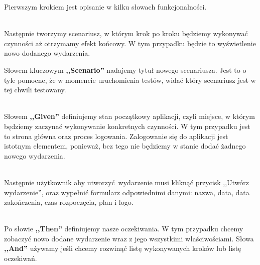 Pierwszym krokiem jest opisanie w kilku słowach funkcjonalności.
\begin{code}
	
\end{code}\\

Następnie tworzymy scenariusz, w którym krok po kroku będziemy wykonywać czynności aż otrzymamy efekt końcowy. W tym przypadku będzie to wyświetlenie nowo dodanego wydarzenia.

Słowem kluczowym \textbf{,,Scenario''} nadajemy tytuł nowego scenariusza. Jest to o~ tyle pomocne, że w momencie uruchomienia testów, widać który scenariusz jest w tej chwili testowany.

\begin{code}
	
\end{code}\\

Słowem \textbf{,,Given''} definiujemy stan początkowy aplikacji, czyli miejsce, w którym będziemy zaczynać wykonywanie konkretnych czynności. W tym przypadku jest to strona główna oraz proces logowania. Zalogowanie się do aplikacji jest istotnym elementem, ponieważ, bez tego nie będziemy w stanie dodać żadnego nowego wydarzenia.

\begin{code}
	
\end{code}\\

Następnie użytkownik aby utworzyć wydarzenie musi kliknąć przycisk ,,Utwórz wydarzenie'', oraz wypełnić formularz odpowiednimi danymi: nazwa, data, data zakończenia, czas rozpoczęcia, plan i logo.

\begin{code}
	
\end{code}\\

Po słowie \textbf{,,Then''} definiujemy nasze oczekiwania. W tym przypadku chcemy zobaczyć nowo dodane wydarzenie wraz z jego wszystkimi właściwościami. Słowa \textbf{,,And''} używamy jeśli chcemy rozwinąć listę wykonywanych kroków lub listę oczekiwań.

\begin{code}
	
\end{code}\\


